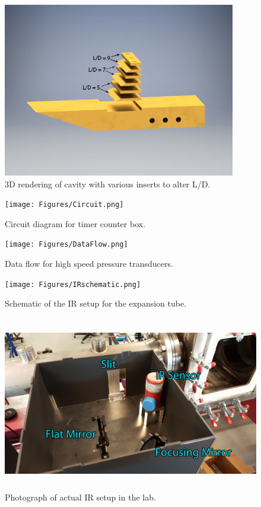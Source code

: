 \begin{figure}
\centering
\includegraphics[height = 3in]{Figures/CavityInserts.jpg}
\caption[Cavity Model with Inserts]{3D rendering of cavity with various inserts to alter L/D.}
\label{fig:cavInserts}
\end{figure}

\begin{figure}
\centering
\texttt{[image: Figures/Circuit.png]}
\caption[Circuit Diagram for Timer Counter Box]{Circuit diagram for timer counter box.}
\label{fig:timercircuit}
\end{figure}


\begin{figure}[p!]
\centering
\texttt{[image: Figures/DataFlow.png]}
\caption[Data Flow for High Speed Pressure Transducers]{Data flow for high speed pressure transducers.}
\label{fig:DataFlow}
\end{figure}
\clearpage

\begin{figure}
\centering
\texttt{[image: Figures/IRschematic.png]}
\caption[IR setup diagram]{Schematic of the IR setup for the expansion tube.}
\label{fig:IRschematic}
\end{figure}

\begin{figure}
\centering
\includegraphics[height = 3in]{Figures/IRLabeled.jpg}
\caption[Labeled photograph of IR setup]{Photograph of actual IR setup in the lab.}
\label{fig:IRlabel}
\end{figure}

